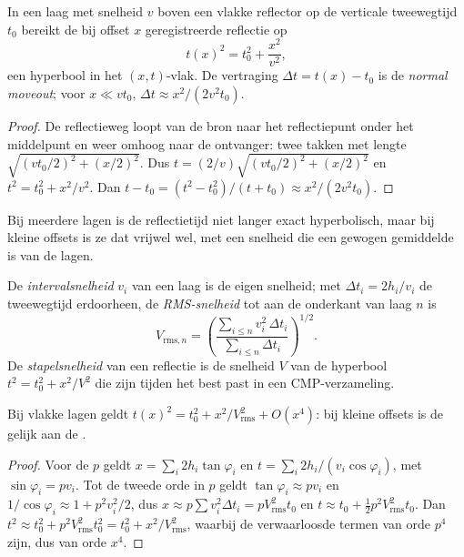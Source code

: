 \begin{theorem}\label{thm:b3:exploration-seismology:nmo}
In een laag met snelheid $v$ boven een vlakke reflector op de verticale tweewegtijd
$t_0$ bereikt de bij offset $x$ geregistreerde reflectie op
\[
  t(x)^2 = t_0^2 + \frac{x^2}{v^2},
\]
een hyperbool in het $(x, t)$-vlak. De vertraging $\Delta t = t(x) - t_0$ is de
\emph{normal moveout}; voor $x \ll vt_0$,
$\Delta t \approx x^2/(2v^2t_0)$.
\end{theorem}

\begin{proof}
De reflectieweg loopt van de bron naar het reflectiepunt onder het
middelpunt en weer omhoog naar de ontvanger: twee takken met lengte
$\sqrt{(vt_0/2)^2 + (x/2)^2}$. Dus $t = (2/v)\sqrt{(vt_0/2)^2 + (x/2)^2}$ en
$t^2 = t_0^2 + x^2/v^2$. Dan $t - t_0 = (t^2 - t_0^2)/(t + t_0) \approx
x^2/(2v^2t_0)$.
\end{proof}

Bij meerdere lagen is de reflectietijd niet langer exact hyperbolisch, maar
bij kleine offsets is ze dat vrijwel wel, met een snelheid die een gewogen gemiddelde is van de
lagen.

\begin{definition}\label{def:b3:exploration-seismology:velocities}
De \emph{intervalsnelheid} $v_i$ van een laag is de
eigen snelheid; met $\Delta t_i = 2h_i/v_i$ de tweewegtijd erdoorheen, de
\emph{RMS-snelheid} tot aan de
onderkant van laag $n$ is
\[
  V_{\text{rms},n} = \left(\frac{\sum_{i\le n}v_i^2\,\Delta t_i}{\sum_{i\le n}\Delta t_i}\right)^{1/2}.
\]
De \emph{stapelsnelheid} van een reflectie is de
snelheid $V$ van de hyperbool $t^2 = t_0^2 + x^2/V^2$ die zijn tijden het best past in een
CMP-verzameling.
\end{definition}

\begin{proposition}\label{prop:b3:exploration-seismology:rms}
Bij vlakke lagen geldt $t(x)^2 = t_0^2 + x^2/V_{\text{rms}}^2 + O(x^4)$: bij kleine
offsets is de  gelijk aan de .
\end{proposition}

\begin{proof}
Voor de  $p$ geldt $x = \sum_i 2h_i\tan\varphi_i$ en
$t = \sum_i 2h_i/(v_i\cos\varphi_i)$, met $\sin\varphi_i = pv_i$. Tot de tweede
orde in $p$ geldt $\tan\varphi_i \approx pv_i$ en $1/\cos\varphi_i \approx 1 +
p^2v_i^2/2$, dus $x \approx p\sum v_i^2\Delta t_i = pV_{\text{rms}}^2t_0$ en
$t \approx t_0 + \tfrac12p^2V_{\text{rms}}^2t_0$. Dan
$t^2 \approx t_0^2 + p^2V_{\text{rms}}^2t_0^2 = t_0^2 + x^2/V_{\text{rms}}^2$, waarbij
de verwaarloosde termen van orde $p^4$ zijn, dus van orde $x^4$.
\end{proof}

